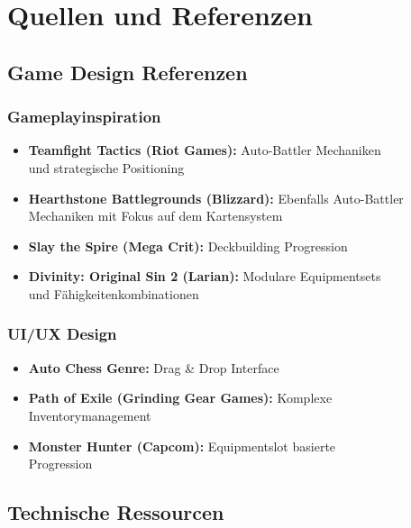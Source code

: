 \chapter{Quellen und Referenzen}
\label{chap:quellen}

\section{Game Design Referenzen}

\subsection{Gameplayinspiration}
\begin{itemize}
    \item \textbf{Teamfight Tactics (Riot Games):} Auto-Battler Mechaniken \\
          und strategische Positioning
    \item \textbf{Hearthstone Battlegrounds (Blizzard):} Ebenfalls Auto-Battler \\
          Mechaniken mit Fokus auf dem Kartensystem
    \item \textbf{Slay the Spire (Mega Crit):} Deckbuilding Progression
    \item \textbf{Divinity: Original Sin 2 (Larian):} Modulare Equipmentsets \\
          und Fähigkeitenkombinationen
\end{itemize}

\subsection{UI/UX Design}
\begin{itemize}
    \item \textbf{Auto Chess Genre:} Drag \& Drop Interface
    \item \textbf{Path of Exile (Grinding Gear Games):} Komplexe \\
          Inventorymanagement
    \item \textbf{Monster Hunter (Capcom):} Equipmentslot basierte \\
          Progression
\end{itemize}

\section{Technische Ressourcen}

